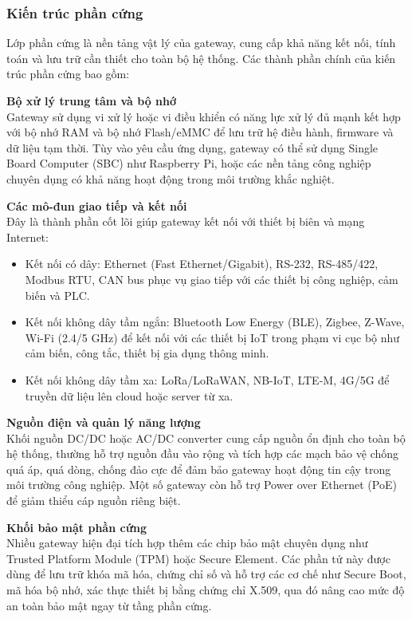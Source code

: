                 \subsubsection{Kiến trúc phần cứng}
                    Lớp phần cứng là nền tảng vật lý của gateway, cung cấp khả năng kết nối, tính toán và lưu trữ cần thiết cho toàn bộ hệ thống. Các thành phần chính của kiến trúc phần cứng bao gồm:

                    \textbf{Bộ xử lý trung tâm và bộ nhớ} \\
                        Gateway sử dụng vi xử lý hoặc vi điều khiển có năng lực xử lý đủ mạnh kết hợp với bộ nhớ RAM và bộ nhớ Flash/eMMC để lưu trữ hệ điều hành, firmware và dữ liệu tạm thời. Tùy vào yêu cầu ứng dụng, gateway có thể sử dụng Single Board Computer (SBC) như Raspberry Pi, hoặc các nền tảng công nghiệp chuyên dụng có khả năng hoạt động trong môi trường khắc nghiệt.

                    \textbf{Các mô-đun giao tiếp và kết nối} \\
                        Đây là thành phần cốt lõi giúp gateway kết nối với thiết bị biên và mạng Internet:
                        \begin{itemize}
                            \item Kết nối có dây: Ethernet (Fast Ethernet/Gigabit), RS-232, RS-485/422, Modbus RTU, CAN bus phục vụ giao tiếp với các thiết bị công nghiệp, cảm biến và PLC.
                            \item Kết nối không dây tầm ngắn: Bluetooth Low Energy (BLE), Zigbee, Z-Wave, Wi-Fi (2.4/5 GHz) để kết nối với các thiết bị IoT trong phạm vi cục bộ như cảm biến, công tắc, thiết bị gia dụng thông minh.
                            \item Kết nối không dây tầm xa: LoRa/LoRaWAN, NB-IoT, LTE-M, 4G/5G để truyền dữ liệu lên cloud hoặc server từ xa.
                        \end{itemize}

                    \textbf{Nguồn điện và quản lý năng lượng} \\
                        Khối nguồn DC/DC hoặc AC/DC converter cung cấp nguồn ổn định cho toàn bộ hệ thống, thường hỗ trợ nguồn đầu vào rộng và tích hợp các mạch bảo vệ chống quá áp, quá dòng, chống đảo cực để đảm bảo gateway hoạt động tin cậy trong môi trường công nghiệp. Một số gateway còn hỗ trợ Power over Ethernet (PoE) để giảm thiểu cáp nguồn riêng biệt.

                    \textbf{Khối bảo mật phần cứng}\\
                        Nhiều gateway hiện đại tích hợp thêm các chip bảo mật chuyên dụng như Trusted Platform Module (TPM) hoặc Secure Element. Các phần tử này được dùng để lưu trữ khóa mã hóa, chứng chỉ số và hỗ trợ các cơ chế như Secure Boot, mã hóa bộ nhớ, xác thực thiết bị bằng chứng chỉ X.509, qua đó nâng cao mức độ an toàn bảo mật ngay từ tầng phần cứng.


